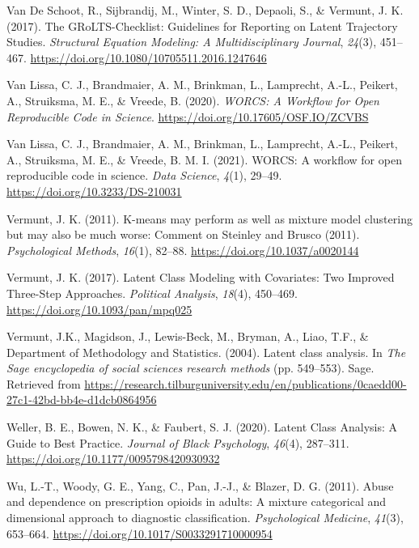 \documentclass[
  ,man,floatsintext]{apa6}
\newlength{\cslhangindent}
\newlength{\cslentryspacingunit} %
\newenvironment{CSLReferences}[2] %
 {%
  \setlength{\parindent}{0pt}
  \ifodd #1
  \let\oldpar\par
  \def\par{\hangindent=\cslhangindent\oldpar}
  \fi
  \setlength{\parskip}{#2\cslentryspacingunit}
 }%
 {}
\begin{document}
\begin{CSLReferences}{1}{0}
\leavevmode{}%
Van De Schoot, R., Sijbrandij, M., Winter, S. D., Depaoli, S., \& Vermunt, J. K. (2017). The {GRoLTS}-{Checklist}: {Guidelines} for {Reporting} on {Latent} {Trajectory} {Studies}. \emph{Structural Equation Modeling: A Multidisciplinary Journal}, \emph{24}(3), 451--467. \url{https://doi.org/10.1080/10705511.2016.1247646}

\leavevmode{}%
Van Lissa, C. J., Brandmaier, A. M., Brinkman, L., Lamprecht, A.-L., Peikert, A., Struiksma, M. E., \& Vreede, B. (2020). \emph{{WORCS}: {A} {Workflow} for {Open} {Reproducible} {Code} in {Science}}. \url{https://doi.org/10.17605/OSF.IO/ZCVBS}

\leavevmode{}%
Van Lissa, C. J., Brandmaier, A. M., Brinkman, L., Lamprecht, A.-L., Peikert, A., Struiksma, M. E., \& Vreede, B. M. I. (2021). {WORCS}: {A} workflow for open reproducible code in science. \emph{Data Science}, \emph{4}(1), 29--49. \url{https://doi.org/10.3233/DS-210031}

\leavevmode{}%
Vermunt, J. K. (2011). K-means may perform as well as mixture model clustering but may also be much worse: {Comment} on {Steinley} and {Brusco} (2011). \emph{Psychological Methods}, \emph{16}(1), 82--88. \url{https://doi.org/10.1037/a0020144}

\leavevmode{}%
Vermunt, J. K. (2017). Latent {Class} {Modeling} with {Covariates}: {Two} {Improved} {Three}-{Step} {Approaches}. \emph{Political Analysis}, \emph{18}(4), 450--469. \url{https://doi.org/10.1093/pan/mpq025}

\leavevmode{}%
Vermunt, J.K., Magidson, J., Lewis-Beck, M., Bryman, A., Liao, T.F., \& Department of Methodology and Statistics. (2004). Latent class analysis. In \emph{The {Sage} encyclopedia of social sciences research methods} (pp. 549--553). Sage. Retrieved from \url{https://research.tilburguniversity.edu/en/publications/0caedd00-27c1-42bd-bb4e-d1dcb0864956}

\leavevmode{}%
Weller, B. E., Bowen, N. K., \& Faubert, S. J. (2020). Latent {Class} {Analysis}: {A} {Guide} to {Best} {Practice}. \emph{Journal of Black Psychology}, \emph{46}(4), 287--311. \url{https://doi.org/10.1177/0095798420930932}

\leavevmode{}%
Wu, L.-T., Woody, G. E., Yang, C., Pan, J.-J., \& Blazer, D. G. (2011). Abuse and dependence on prescription opioids in adults: A mixture categorical and dimensional approach to diagnostic classification. \emph{Psychological Medicine}, \emph{41}(3), 653--664. \url{https://doi.org/10.1017/S0033291710000954}

\end{CSLReferences}
\end{document}
